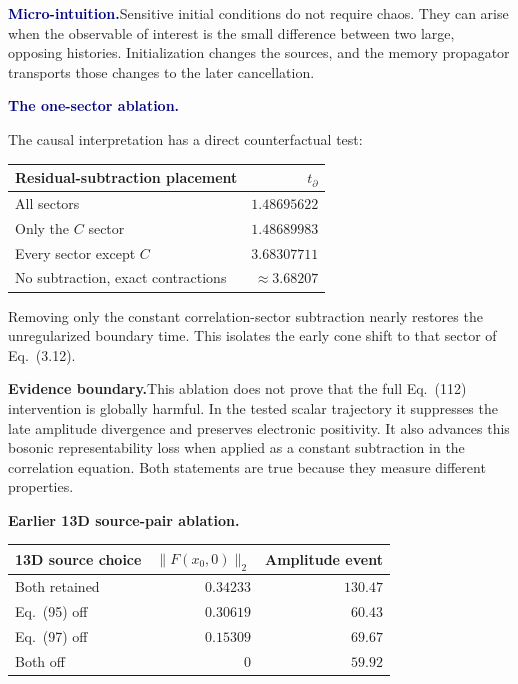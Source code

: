\documentclass[10pt]{article}
\newcommand{\pedbox}[2]{%
  \par\medskip
  \noindent\colorbox{pale}{%
    \parbox{\dimexpr\linewidth-2\fboxsep\relax}{%
      \textcolor{navy}{\textbf{#1}}\quad #2%
    }%
  }\par\medskip
}
\newcommand{\intuition}[1]{\pedbox{Micro-intuition.}{#1}}
\newcommand{\warningbox}[1]{%
  \par\medskip
  \noindent\colorbox{palered}{%
    \parbox{\dimexpr\linewidth-2\fboxsep\relax}{%
      \textcolor{brick}{\textbf{Evidence boundary.}}\quad #1%
    }%
  }\par\medskip
}
\newcommand{\flowlead}[1]{%
  \par\medskip
  \needspace{3\baselineskip}%
  \noindent\textcolor{navy}{\textbf{#1.}}\enspace\ignorespaces
}
\begin{document}
\intuition{Sensitive initial conditions do not require chaos.  They can arise
when the observable of interest is the small difference between two large,
opposing histories.  Initialization changes the sources, and the memory
propagator transports those changes to the later cancellation.}

\flowlead{The one-sector ablation}

The causal interpretation has a direct counterfactual test:
\begin{center}
\begin{tabularx}{\linewidth}{@{}Y r@{}}
\toprule
Residual-subtraction placement & \(t_\partial\)\\
\midrule
All sectors & \(1.48695622\)\\
Only the \(C\) sector & \(1.48689983\)\\
Every sector except \(C\) & \(3.68307711\)\\
No subtraction, exact contractions & \(\approx3.68207\)\\
\bottomrule
\end{tabularx}
\end{center}
Removing only the constant correlation-sector subtraction nearly restores
the unregularized boundary time.  This isolates the early cone shift to that
sector of Eq.~(3.12).

\warningbox{This ablation does not prove that the full Eq.~(112) intervention
is globally harmful.  In the tested scalar trajectory it suppresses the late
amplitude divergence and preserves electronic positivity.  It also advances
this bosonic representability loss when applied as a constant subtraction in
the correlation equation.  Both statements are true because they measure
different properties.}

\begin{center}
\small
\textbf{Earlier 13D source-pair ablation.}\par
\smallskip
\begin{tabularx}{\linewidth}{@{}Yrr@{}}
\toprule
13D source choice & \(\|F(x_0,0)\|_2\) & Amplitude event\\
\midrule
Both retained & \(0.34233\) & \(130.47\)\\
Eq.~(95) off & \(0.30619\) & \(60.43\)\\
Eq.~(97) off & \(0.15309\) & \(69.67\)\\
Both off & \(0\) & \(59.92\)\\
\bottomrule
\end{tabularx}
\end{center}
\end{document}
